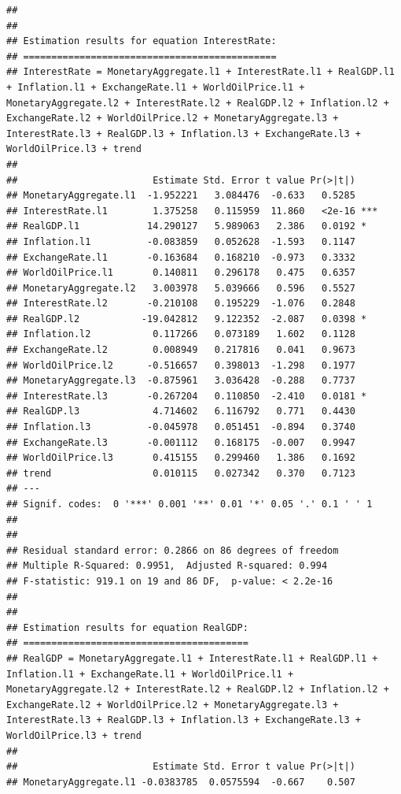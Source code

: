 \documentclass[11pt,preprint, authoryear]{elsarticle}
\numberwithin{equation}{section}
\numberwithin{figure}{section}
\numberwithin{table}{section}
\begin{document}
\begin{verbatim}
## 
## 
## Estimation results for equation InterestRate: 
## ============================================= 
## InterestRate = MonetaryAggregate.l1 + InterestRate.l1 + RealGDP.l1 + Inflation.l1 + ExchangeRate.l1 + WorldOilPrice.l1 + MonetaryAggregate.l2 + InterestRate.l2 + RealGDP.l2 + Inflation.l2 + ExchangeRate.l2 + WorldOilPrice.l2 + MonetaryAggregate.l3 + InterestRate.l3 + RealGDP.l3 + Inflation.l3 + ExchangeRate.l3 + WorldOilPrice.l3 + trend 
## 
##                        Estimate Std. Error t value Pr(>|t|)    
## MonetaryAggregate.l1  -1.952221   3.084476  -0.633   0.5285    
## InterestRate.l1        1.375258   0.115959  11.860   <2e-16 ***
## RealGDP.l1            14.290127   5.989063   2.386   0.0192 *  
## Inflation.l1          -0.083859   0.052628  -1.593   0.1147    
## ExchangeRate.l1       -0.163684   0.168210  -0.973   0.3332    
## WorldOilPrice.l1       0.140811   0.296178   0.475   0.6357    
## MonetaryAggregate.l2   3.003978   5.039666   0.596   0.5527    
## InterestRate.l2       -0.210108   0.195229  -1.076   0.2848    
## RealGDP.l2           -19.042812   9.122352  -2.087   0.0398 *  
## Inflation.l2           0.117266   0.073189   1.602   0.1128    
## ExchangeRate.l2        0.008949   0.217816   0.041   0.9673    
## WorldOilPrice.l2      -0.516657   0.398013  -1.298   0.1977    
## MonetaryAggregate.l3  -0.875961   3.036428  -0.288   0.7737    
## InterestRate.l3       -0.267204   0.110850  -2.410   0.0181 *  
## RealGDP.l3             4.714602   6.116792   0.771   0.4430    
## Inflation.l3          -0.045978   0.051451  -0.894   0.3740    
## ExchangeRate.l3       -0.001112   0.168175  -0.007   0.9947    
## WorldOilPrice.l3       0.415155   0.299460   1.386   0.1692    
## trend                  0.010115   0.027342   0.370   0.7123    
## ---
## Signif. codes:  0 '***' 0.001 '**' 0.01 '*' 0.05 '.' 0.1 ' ' 1
## 
## 
## Residual standard error: 0.2866 on 86 degrees of freedom
## Multiple R-Squared: 0.9951,  Adjusted R-squared: 0.994 
## F-statistic: 919.1 on 19 and 86 DF,  p-value: < 2.2e-16 
## 
## 
## Estimation results for equation RealGDP: 
## ======================================== 
## RealGDP = MonetaryAggregate.l1 + InterestRate.l1 + RealGDP.l1 + Inflation.l1 + ExchangeRate.l1 + WorldOilPrice.l1 + MonetaryAggregate.l2 + InterestRate.l2 + RealGDP.l2 + Inflation.l2 + ExchangeRate.l2 + WorldOilPrice.l2 + MonetaryAggregate.l3 + InterestRate.l3 + RealGDP.l3 + Inflation.l3 + ExchangeRate.l3 + WorldOilPrice.l3 + trend 
## 
##                        Estimate Std. Error t value Pr(>|t|)    
## MonetaryAggregate.l1 -0.0383785  0.0575594  -0.667    0.507    

\end{verbatim}
\end{document}
